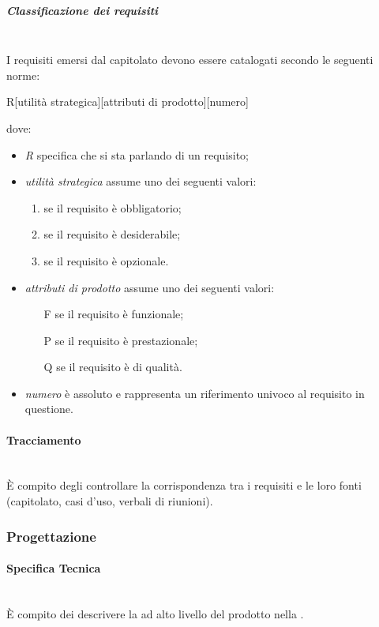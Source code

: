 \subparagraph{Classificazione dei requisiti}\mbox{}\\
I requisiti emersi dal capitolato devono essere catalogati secondo le seguenti norme:
\begin{center}
	R[utilità strategica][attributi di prodotto][numero]
\end{center}
dove:
\begin{itemize}
	\item \textit{R} specifica che si sta parlando di un requisito;
	\item \textit{utilità strategica} assume uno dei seguenti valori:
	\begin{enumerate}
		\item se il requisito è obbligatorio;
		\item se il requisito è desiderabile;
		\item se il requisito è opzionale.
	\end{enumerate}
	\item \textit{attributi di prodotto} assume uno dei seguenti valori:
	\begin{itemize}
		\item [F] se il requisito è funzionale;
		\item [P] se il requisito è prestazionale;
		\item [Q] se il requisito è di qualità.
	\end{itemize}
	\item \textit{numero} è assoluto e rappresenta un riferimento univoco al requisito in questione.
\end{itemize}

\paragraph{Tracciamento}\mbox{}\\
\`{E} compito degli \Analisti{} controllare la corrispondenza tra i requisiti e le loro fonti (capitolato, casi d'uso, verbali di riunioni).

\subsubsection{Progettazione}
\paragraph{Specifica Tecnica}\mbox{}\\
\`{E} compito dei \Progettisti{} descrivere la \PA{} ad alto livello del prodotto nella \SpecificaTecnica.


